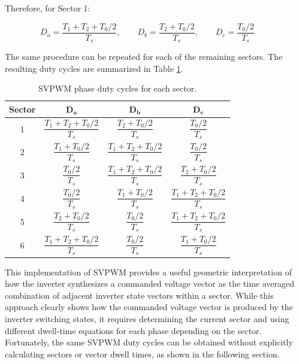 \documentclass{article}
\begin{document}
Therefore, for Sector 1:

\begin{equation}
    D_a = \frac{T_1 + T_2 + T_0/2}{T_s}, \qquad
    D_b = \frac{T_2 + T_0/2}{T_s}, \qquad
    D_c = \frac{T_0/2}{T_s} \qquad
\end{equation}

The same procedure can be repeated for each of the remaining sectors. The resulting duty cycles are summarized in Table \ref{tab:svpwm-duty-cycles}.

\begin{table}[H]
    \centering
    \caption{SVPWM phase duty cycles for each sector.}
    \label{tab:svpwm-duty-cycles}
    \renewcommand{\arraystretch}{2.1}
    \begin{tabular}{c|c|c|c}
        \hline
        \textbf{Sector}
        & $\boldsymbol{D_a}$
        & $\boldsymbol{D_b}$
        & $\boldsymbol{D_c}$ \\
        \hline

        1 &
        $\dfrac{T_1+T_2+T_0/2}{T_s}$ &
        $\dfrac{T_2+T_0/2}{T_s}$ &
        $\dfrac{T_0/2}{T_s}$ \\

        2 &
        $\dfrac{T_1+T_0/2}{T_s}$ &
        $\dfrac{T_1+T_2+T_0/2}{T_s}$ &
        $\dfrac{T_0/2}{T_s}$ \\

        3 &
        $\dfrac{T_0/2}{T_s}$ &
        $\dfrac{T_1+T_2+T_0/2}{T_s}$ &
        $\dfrac{T_2+T_0/2}{T_s}$ \\

        4 &
        $\dfrac{T_0/2}{T_s}$ &
        $\dfrac{T_1+T_0/2}{T_s}$ &
        $\dfrac{T_1+T_2+T_0/2}{T_s}$ \\

        5 &
        $\dfrac{T_2+T_0/2}{T_s}$ &
        $\dfrac{T_0/2}{T_s}$ &
        $\dfrac{T_1+T_2+T_0/2}{T_s}$ \\

        6 &
        $\dfrac{T_1+T_2+T_0/2}{T_s}$ &
        $\dfrac{T_0/2}{T_s}$ &
        $\dfrac{T_1+T_0/2}{T_s}$ \\

        \hline
    \end{tabular}
\end{table}

This implementation of SVPWM provides a useful geometric interpretation of how the inverter synthesizes a commanded voltage vector as the time averaged combination of adjacent inverter state vectors within a sector. While this approach clearly shows how the commanded voltage vector is produced by the inverter switching states, it requires determining the current sector and using different dwell-time equations for each phase depending on the sector. Fortunately, the same SVPWM duty cycles can be obtained without explicitly calculating sectors or vector dwell times, as shown in the following section.
\end{document}
